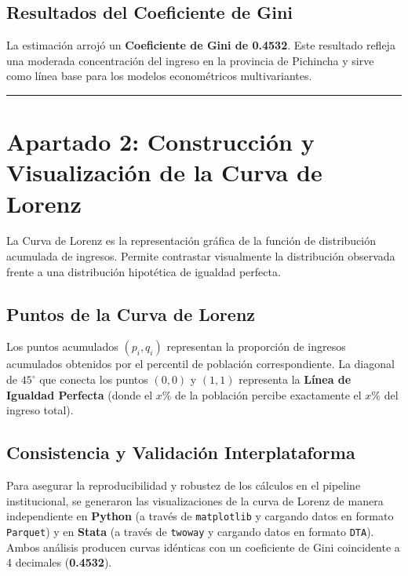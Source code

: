 \documentclass[12pt,spanish]{article}
\begin{document}
\subsection{Resultados del Coeficiente de
Gini}\label{resultados-del-coeficiente-de-gini}

La estimación arrojó un \textbf{Coeficiente de Gini de 0.4532}. Este
resultado refleja una moderada concentración del ingreso en la provincia
de Pichincha y sirve como línea base para los modelos econométricos
multivariantes.

\begin{center}\rule{0.5\linewidth}{0.5pt}\end{center}

\section{Apartado 2: Construcción y Visualización de la Curva de
Lorenz}\label{apartado-2-construcciuxf3n-y-visualizaciuxf3n-de-la-curva-de-lorenz}

La Curva de Lorenz es la representación gráfica de la función de
distribución acumulada de ingresos. Permite contrastar visualmente la
distribución observada frente a una distribución hipotética de igualdad
perfecta.

\subsection{Puntos de la Curva de
Lorenz}\label{puntos-de-la-curva-de-lorenz}

Los puntos acumulados \((p_i, q_i)\) representan la proporción de
ingresos acumulados obtenidos por el percentil de población
correspondiente. La diagonal de \(45^\circ\) que conecta los puntos
\((0,0)\) y \((1,1)\) representa la \textbf{Línea de Igualdad Perfecta}
(donde el \(x\%\) de la población percibe exactamente el \(x\%\) del
ingreso total).

\subsection{Consistencia y Validación
Interplataforma}\label{consistencia-y-validaciuxf3n-interplataforma}

Para asegurar la reproducibilidad y robustez de los cálculos en el
pipeline institucional, se generaron las visualizaciones de la curva de
Lorenz de manera independiente en \textbf{Python} (a través de
\texttt{matplotlib} y cargando datos en formato \texttt{Parquet}) y en
\textbf{Stata} (a través de \texttt{twoway} y cargando datos en formato
\texttt{DTA}). Ambos análisis producen curvas idénticas con un
coeficiente de Gini coincidente a 4 decimales (\textbf{0.4532}).
\end{document}
